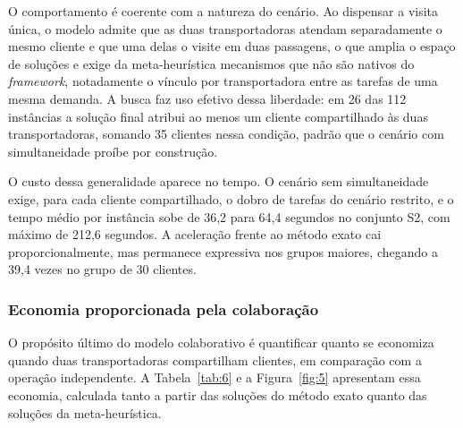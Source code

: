 \documentclass[a4paper,12pt]{article}
\begin{document}
O comportamento é coerente com a natureza do cenário. Ao dispensar a visita única, o modelo admite que as duas transportadoras atendam separadamente o mesmo cliente e que uma delas o visite em duas passagens, o que amplia o espaço de soluções e exige da meta-heurística mecanismos que não são nativos do \textit{framework}, notadamente o vínculo por transportadora entre as tarefas de uma mesma demanda. A busca faz uso efetivo dessa liberdade: em 26 das 112 instâncias a solução final atribui ao menos um cliente compartilhado às duas transportadoras, somando 35 clientes nessa condição, padrão que o cenário com simultaneidade proíbe por construção.

O custo dessa generalidade aparece no tempo. O cenário sem simultaneidade exige, para cada cliente compartilhado, o dobro de tarefas do cenário restrito, e o tempo médio por instância sobe de 36,2 para 64,4 segundos no conjunto S2, com máximo de 212,6 segundos. A aceleração frente ao método exato cai proporcionalmente, mas permanece expressiva nos grupos maiores, chegando a 39,4 vezes no grupo de 30 clientes.

\subsubsection{Economia proporcionada pela colaboração}
O propósito último do modelo colaborativo é quantificar quanto se economiza quando duas transportadoras compartilham clientes, em comparação com a operação independente. A Tabela~\ref{tab:6} e a Figura~\ref{fig:5} apresentam essa economia, calculada tanto a partir das soluções do método exato quanto das soluções da meta-heurística.
\end{document}
